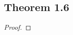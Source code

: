 \documentclass[../../main.tex]{subfiles}
\begin{document}
\subsection{Theorem 1.6}
\begin{wts}

\end{wts}
\begin{proof}

\end{proof}
\end{document}
